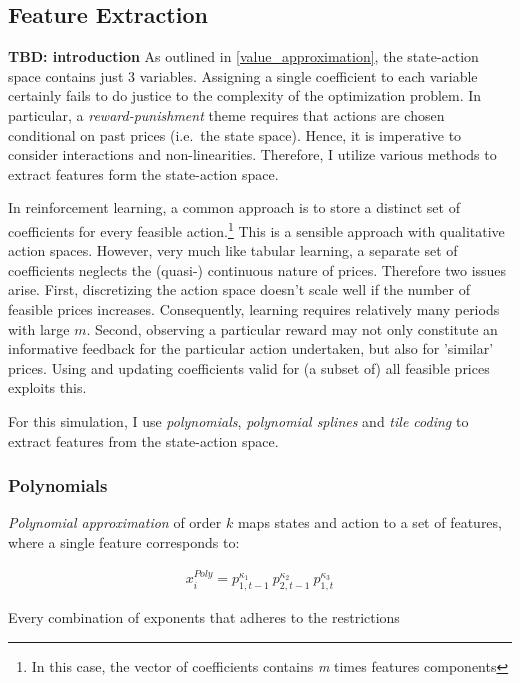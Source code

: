 
\subsection{Feature Extraction}\label{feature_extraction}

\textbf{TBD: introduction}
As outlined in \autoref{value_approximation}, the state-action space contains just 3 variables. Assigning a single coefficient to each variable certainly fails to do justice to the complexity of the optimization problem. In particular, a \emph{reward-punishment} theme requires that actions are chosen conditional on past prices (i.e.\ the state space). Hence, it is imperative to consider interactions and non-linearities. Therefore, I utilize various methods to extract features form the state-action space.

In reinforcement learning, a common approach is to store a distinct set of coefficients for every feasible action.\footnote{In this case, the vector of coefficients contains \emph{m} times features components} This is a sensible approach with qualitative action spaces. However, very much like tabular learning, a separate set of coefficients neglects the (quasi-) continuous nature of prices. Therefore two issues arise. First, discretizing the action space doesn't scale well if the number of feasible prices increases. Consequently, learning requires relatively many periods with large $m$. Second, observing a particular reward may not only constitute an informative feedback for the particular action undertaken, but also for 'similar' prices. Using and updating coefficients valid for (a subset of) all feasible prices exploits this.

For this simulation, I use \emph{polynomials}, \emph{polynomial splines} and \emph{tile coding} to extract features from the state-action space.

\subsubsection{Polynomials}

\emph{Polynomial approximation} of order $k$ maps states and action to a set of features, where a single feature corresponds to:



\begin{gather}
x_i^{Poly} = p_{1, t-1}^{\kappa_1} ~ p_{2, t-1}^{\kappa_2} ~ p_{1, t}^{\kappa_3}
\end{gather}


Every combination of exponents that adheres to the restrictions

